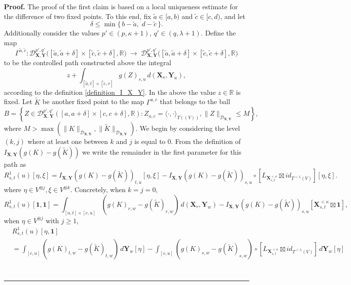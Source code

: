 \documentclass{article}%
\newenvironment{proof}[1][Proof]{\noindent\textbf{#1.} }{\ \rule{0.5em}{0.5em}}
\begin{document}
\begin{proof}
The proof of the first claim is based on a local uniqueness estimate for the difference of two fixed points. To this end, fix $\tilde a \in [a,b)$ and
$\tilde c \in [c,d)$, and let
\[
\delta \le \min\{\, b-\tilde a,\; d-\tilde c \,\}.
\]
Additionally consider the values $p' \in (p, \kappa + 1)$, $q' \in (q, \lambda+1)$.\newline 
Define the map
\[
\Gamma^{\tilde a,\tilde c} :
\mathcal{D}^{p',q'}_{\mathbf{X},\mathbf{Y}}
\big([\tilde a,\tilde a+\delta]\times[\tilde c,\tilde c+\delta],\mathbb{R}\big)
\;\longrightarrow\;
\mathcal{D}^{p',q'}_{\mathbf{X},\mathbf{Y}}
\big([\tilde a,\tilde a+\delta]\times[\tilde c,\tilde c+\delta],\mathbb{R}\big)
\]
to be the controlled path constructed above the integral 
\[
z + \int_{[\tilde a,t]\times[\tilde c,v]}
g\!\left(Z\right)_{s,u}\, d(\mathbf{X}_s,\mathbf{Y}_u),
\]
according to the definition \eqref{definition_I_X_Y}. In the above the value $z \in \mathbb{R}$ is fixed.
Let $\tilde{K}$ be another fixed point to the map $\Gamma^{a, c}$ that belongs to the ball
\[
B = \left \{ Z \in \mathcal{D}^{p', q'}_{\mathbf{X}, \mathbf{Y}}([a,a+\delta] \times [c, c+\delta], \mathbb{R}): Z_{a,c} = \langle \cdot  ,  \cdot  \rangle_{T((V))},  \| Z \|_{\mathcal{D}_{\mathbf{X}, \mathbf{Y}}} \leq M  \right \},
\]
where $M > \max\left( \|K\|_{\mathcal{D}_{\mathbf{X}, \mathbf{Y}}} , \|\tilde K\|_{\mathcal{D}_{\mathbf{X}, \mathbf{Y}}} \right)$.\newline
We begin by considering the level $(k,j)$ where at least one between $k$ and $j$ is equal to $0$. From the definition of $I_{\mathbf{X}, \mathbf{Y}}(g(K)-g(\tilde{K}))$ we write the remainder in the first parameter for this path as  
\[
R^{1}_{s,t}(u)[\eta, \xi] = I_{\mathbf{X}, \mathbf{Y}}(g(K)-g(\tilde{K}))_{t,u}[\eta, \xi] - I_{\mathbf{X}, \mathbf{Y}}(g(K)-g(\tilde{K}))_{s,u} \circ \left[ L_{\mathbf{X}^{< \kappa}_{s,t}} \boxtimes id_{T^{< \lambda}(V)} \right][\eta, \xi]. 
\]
where $\eta \in V^{\otimes j}, \xi \in V^{\otimes k}$.\newline
Concretely, when $k=j=0$, 
\[
R^{1}_{s,t}(u)[\mathbf{1}, \mathbf{1}] = \int_{[a, t]\times [c,u]}\left( g(K)_{r,w} - g(\tilde{K})_{r,w} \right) \, d(\mathbf{X}_r, \mathbf{Y}_w) - I_{\mathbf{X}, \mathbf{Y}}(g(K)-g(\tilde{K}))_{s,u} \left[\mathbf{X}^{< \kappa}_{s,t} \boxtimes \mathbf{1}\right],
\]
when $\eta \in V^{\otimes j} $ with $j \ge 1$, 
\begin{align*}
&R^{1}_{s,t}(u)[\eta, \mathbf{1}]\\
&= \int_{[c,u]} \left(g(K)_{t,w} - g(\tilde{K})_{t,w} \right) \, d \mathbf{Y}_w [\eta] - \int_{[c,u]}\left( g(K)_{s,w} - g(\tilde{K})_{s,w}\right) \circ \left[L_{\mathbf{X}^{< \kappa}_{s,t}} \boxtimes id_{T^{< \lambda}(V)}\right]\, d \mathbf{Y}_w [\eta]\\

\end{align*}
\end{proof}
\end{document}
